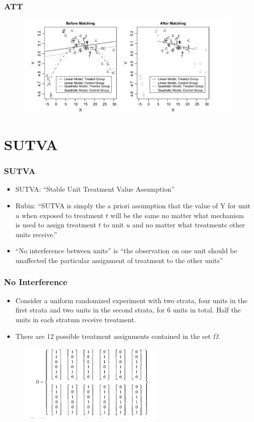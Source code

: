 \documentclass{beamer}
\begin{document}
\begin{frame}[c]\frametitle{ATT}
	\begin{figure}[htbp]
		\centering
			\includegraphics[height=2in]{imbalance.png}
		\label{fig:imbalance}
	\end{figure}
	
	
\end{frame}
\section{SUTVA}	
	\begin{frame}[t]\frametitle{SUTVA}
		\begin{itemize}
			\item<+-> SUTVA: ``Stable Unit Treatment Value Assumption''
			\item<+-> Rubin: ``SUTVA is simply the a priori assumption that the value of Y for unit $u$ when exposed to treatment $t$ will be the same no matter what mechanism is used to assign treatment $t$ to unit $u$ and no matter what treatments other units receive.''
			\item<+-> ``No interference between units'' is  ``the observation on one unit should be unaffected the particular  assignment of treatment to the other units''
		\end{itemize}
	\end{frame}
	
	\begin{frame}[t]\frametitle{No Interference}
		\begin{itemize}
			\item Consider a uniform randomized experiment with two strata, four units in the first strata and two units in the second strata, for 6 units in total. Half the units in each stratum receive treatment. 
			\item There are 12 possible treatment assignments contained in the set $\Omega$.			
		\end{itemize}
		\begin{figure}[htbp]
			\centering
				\includegraphics[height=1.5in]{omega.png}
			\label{fig:omega}
		\end{figure}		
	\end{frame}
	
\end{document}
